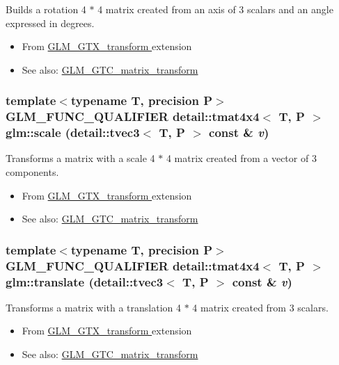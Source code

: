 Builds a rotation 4 $\ast$ 4 matrix created from an axis of 3 scalars and an angle expressed in degrees.\begin{itemize}
\item From \hyperlink{group__gtx__transform}{GLM\_\-GTX\_\-transform } extension\item See also: \hyperlink{group__gtc__matrix__transform_g1a75da872120125437265872423e0b14}{GLM\_\-GTC\_\-matrix\_\-transform } \end{itemize}
\hypertarget{group__gtx__transform_g70f2d33f150672b9faca3b477fcca2c4}{
\subsubsection[scale]{\setlength{\rightskip}{0pt plus 5cm}template$<$typename T, precision P$>$ GLM\_\-FUNC\_\-QUALIFIER detail::tmat4x4$<$ T, P $>$ glm::scale (detail::tvec3$<$ T, P $>$ const \& {\em v})}}
\label{group__gtx__transform_g70f2d33f150672b9faca3b477fcca2c4}


Transforms a matrix with a scale 4 $\ast$ 4 matrix created from a vector of 3 components.\begin{itemize}
\item From \hyperlink{group__gtx__transform}{GLM\_\-GTX\_\-transform } extension\item See also: \hyperlink{group__gtc__matrix__transform_g5e2bf1cdf124863558884751d611aea6}{GLM\_\-GTC\_\-matrix\_\-transform } \end{itemize}
\hypertarget{group__gtx__transform_gc06efbcc43ab431cf6ae1ba0e6f03e86}{
\subsubsection[translate]{\setlength{\rightskip}{0pt plus 5cm}template$<$typename T, precision P$>$ GLM\_\-FUNC\_\-QUALIFIER detail::tmat4x4$<$ T, P $>$ glm::translate (detail::tvec3$<$ T, P $>$ const \& {\em v})}}
\label{group__gtx__transform_gc06efbcc43ab431cf6ae1ba0e6f03e86}


Transforms a matrix with a translation 4 $\ast$ 4 matrix created from 3 scalars.\begin{itemize}
\item From \hyperlink{group__gtx__transform}{GLM\_\-GTX\_\-transform } extension\item See also: \hyperlink{group__gtc__matrix__transform_gb05e6ebabf535a3d8f9d9bfc3df45143}{GLM\_\-GTC\_\-matrix\_\-transform } \end{itemize}
